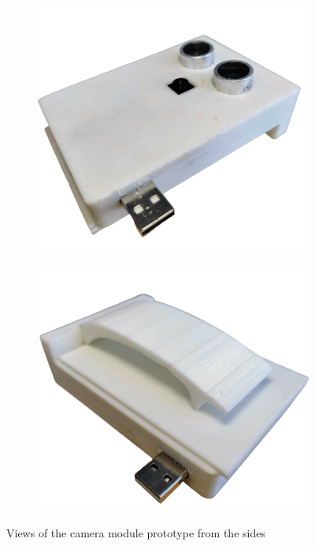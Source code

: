 \begin{figure}[H]
	\centering
	\begin{subfigure}[b]{0.45\textwidth}
		\centering
		\includegraphics[width=\textwidth]{img/Chap5/Prototype_View_side_1.png}
	\end{subfigure}
	\hfill
	\begin{subfigure}[b]{0.45\textwidth}
		\centering
		\includegraphics[width=\textwidth]{img/Chap5/Prototype_View_side_2.png}
	\end{subfigure}
	\caption{Views of the camera module prototype from the sides}
\end{figure}

